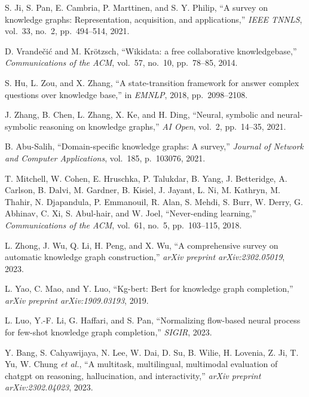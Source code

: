 \begin{enumerate}[leftmargin=2em,label={[\arabic*]}]
\item S. Ji, S. Pan, E. Cambria, P. Marttinen, and S. Y. Philip, ``A survey on knowledge graphs: Representation, acquisition, and applications,'' \textit{IEEE TNNLS}, vol.~33, no.~2, pp.~494--514, 2021.

\item D. Vrande\v{c}i\'{c} and M. Kr\"{o}tzsch, ``Wikidata: a free collaborative knowledgebase,'' \textit{Communications of the ACM}, vol.~57, no.~10, pp.~78--85, 2014.

\item S. Hu, L. Zou, and X. Zhang, ``A state-transition framework for answer complex questions over knowledge base,'' in \textit{EMNLP}, 2018, pp.~2098--2108.

\item J. Zhang, B. Chen, L. Zhang, X. Ke, and H. Ding, ``Neural, symbolic and neural-symbolic reasoning on knowledge graphs,'' \textit{AI Open}, vol.~2, pp.~14--35, 2021.

\item B. Abu-Salih, ``Domain-specific knowledge graphs: A survey,'' \textit{Journal of Network and Computer Applications}, vol.~185, p.~103076, 2021.

\item T. Mitchell, W. Cohen, E. Hruschka, P. Talukdar, B. Yang, J. Betteridge, A. Carlson, B. Dalvi, M. Gardner, B. Kisiel, J. Jayant, L. Ni, M. Kathryn, M. Thahir, N. Djapandula, P. Emmanouil, R. Alan, S. Mehdi, S. Burr, W. Derry, G. Abhinav, C. Xi, S. Abul-hair, and W. Joel, ``Never-ending learning,'' \textit{Communications of the ACM}, vol.~61, no.~5, pp.~103--115, 2018.

\item L. Zhong, J. Wu, Q. Li, H. Peng, and X. Wu, ``A comprehensive survey on automatic knowledge graph construction,'' \textit{arXiv preprint arXiv:2302.05019}, 2023.

\item L. Yao, C. Mao, and Y. Luo, ``Kg-bert: Bert for knowledge graph completion,'' \textit{arXiv preprint arXiv:1909.03193}, 2019.

\item L. Luo, Y.-F. Li, G. Haffari, and S. Pan, ``Normalizing flow-based neural process for few-shot knowledge graph completion,'' \textit{SIGIR}, 2023.

\item Y. Bang, S. Cahyawijaya, N. Lee, W. Dai, D. Su, B. Wilie, H. Lovenia, Z. Ji, T. Yu, W. Chung \textit{et al.}, ``A multitask, multilingual, multimodal evaluation of chatgpt on reasoning, hallucination, and interactivity,'' \textit{arXiv preprint arXiv:2302.04023}, 2023.


\end{enumerate}
